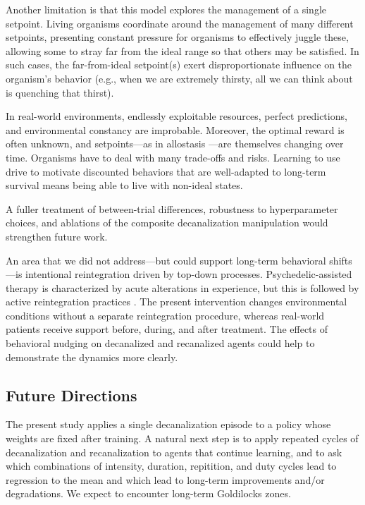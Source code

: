 \documentclass[12pt,fleqn]{article}
\begin{document}
Another limitation is that this model explores the management of a single setpoint. Living organisms coordinate around the management of many different setpoints, presenting constant pressure for organisms to effectively juggle these, allowing some to stray far from the ideal range so that others may be satisfied. In such cases, the far-from-ideal setpoint(s) exert disproportionate influence on the organism's behavior (e.g., when we are extremely thirsty, all we can think about is quenching that thirst).

In real-world environments, endlessly exploitable resources, perfect predictions, and environmental constancy are improbable. Moreover, the optimal reward is often unknown, and setpoints---as in allostasis \cite{sterling_allostasis_1988}---are themselves changing over time. Organisms have to deal with many trade-offs and risks. Learning to use drive to motivate discounted behaviors that are well-adapted to long-term survival means being able to live with non-ideal states.

A fuller treatment of between-trial differences, robustness to hyperparameter choices, and ablations of the composite decanalization manipulation would strengthen future work.

An area that we did not address---but could support long-term behavioral shifts---is intentional reintegration driven by top-down processes. Psychedelic-assisted therapy is characterized by acute alterations in experience, but this is followed by active reintegration practices \cite{bathje_psychedelic_2022}. The present intervention changes environmental conditions without a separate reintegration procedure, whereas real-world patients receive support before, during, and after treatment. The effects of behavioral nudging on decanalized and recanalized agents could help to demonstrate the dynamics more clearly.

\subsection{Future Directions}

The present study applies a single decanalization episode to a policy whose weights are fixed after training. A natural next step is to apply repeated cycles of decanalization and recanalization to agents that continue learning, and to ask which combinations of intensity, duration, repitition, and duty cycles lead to regression to the mean and  which lead to long-term improvements and/or degradations. We expect to encounter long-term Goldilocks zones. 
\end{document}
